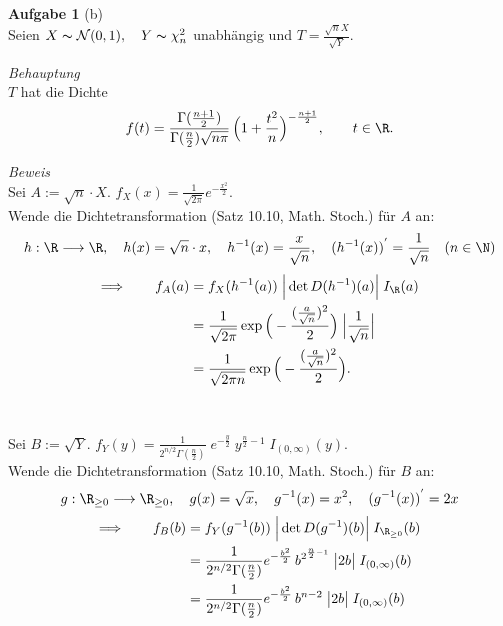 \documentclass[a4paper]{article}
\begin{document}
	\begin{description}
			\item{\textbf{Aufgabe 1} (b)\\ Seien $X \thicksim \mathcal{N}(0,1), \quad Y \thicksim \chi_n^2$ \;unabhängig und $T = \frac{\sqrt{n}X}{\sqrt{Y}}.$
			}
			\item{\textit{Behauptung}\\ $T$ hat die Dichte $$f(t) = \frac{\Gamma(\frac{n+1}{2})}{\Gamma(\frac{n}{2})\sqrt{n\pi}} \,\Big(1 + \frac{t^2}{n}\Big)^{-\frac{n+1}{2}},\qquad t \in \R.$$
			}
			\item{\textit{Beweis}\\ Sei $A := \sqrt{n}\cdot X$. \quad $f_X (x) = \frac{1}{\sqrt{2\pi}} e^{-\frac{x^2}{2}}$.\\Wende die Dichtetransformation (Satz 10.10, Math. Stoch.) für $A$ an: $$h: \R \longrightarrow \R,\quad h(x) = \sqrt{n}\cdot x,\quad h^{-1} (x) = \frac{x}{\sqrt{n}}, \quad (h^{-1}(x))^{'} = \frac{1}{\sqrt{n}} \quad (n\in \N)$$ 
			\begin{equation*}\begin{split}\Longrightarrow\qquad f_A(a) &= f_X(h^{-1}(a)) \;\Big|\det D(h^{-1}) (a)  \Big| \;I_\R(a) 
			\\&= \frac{1}{\sqrt{2\pi}} \exp\Big(-\frac{(\frac{a}{\sqrt{n}})^2}{2}\Big)\; \Big|\frac{1}{\sqrt{n}}  \Big| 
			\\&= \frac{1}{\sqrt{2\pi n}} \exp\Big(-\frac{(\frac{a}{\sqrt{n}})^2}{2}\Big).
			\end{split}\end{equation*}\\\\
			Sei $B := \sqrt{Y}$. \quad $f_Y(y) = \frac{1}{2^{n/2} \Gamma(\frac{n}{2})} \;e^{-\frac{y}{2}} \;y^{\frac{n}{2}-1} \; I_{(0,\infty)} (y)$.
			\\Wende die Dichtetransformation (Satz 10.10, Math. Stoch.) für $B$ an: $$g: \R_{\geq 0} \longrightarrow \R_{\geq 0},\quad g(x) = \sqrt{x},\quad g^{-1} (x) = x^2, \quad (g^{-1}(x))^{'} = 2x$$ 
			\begin{equation*}\begin{split}\Longrightarrow\qquad f_B(b) &= f_Y(g^{-1}(b)) \;\Big|\det D(g^{-1}) (b)  \Big| \;I_{\R_{\geq 0}}(b) 
			\\&= \frac{1}{2^{n/2} \Gamma(\frac{n}{2})} e^{-\frac{b^2}{2}} \,b^{2^{\frac{n}{2}-1}} \; \big|2b\big| \;I_{(0,\infty)}(b)
			\\&= \frac{1}{2^{n/2} \Gamma(\frac{n}{2})} e^{-\frac{b^2}{2}} \,b^{n-2} \; \big|2b\big| \;I_{(0,\infty)}(b)

\end{split}
\end{equation*}}
\end{description}
\end{document}

